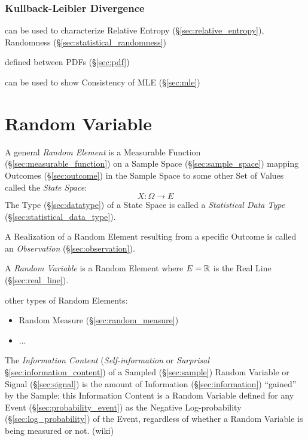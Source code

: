 \subsubsection{Kullback-Leibler Divergence}\label{sec:kullback_leibler}

can be used to characterize Relative Entropy (\S\ref{sec:relative_entropy}),
Randomness (\S\ref{sec:statistical_randomness})

defined between PDFs (\S\ref{sec:pdf})

can be used to show Consistency of MLE (\S\ref{sec:mle})



\section{Random Variable}\label{sec:random_variable}

A general \emph{Random Element} is a Measurable Function
(\S\ref{sec:measurable_function}) on a Sample Space (\S\ref{sec:sample_space})
mapping Outcomes (\S\ref{sec:outcome}) in the Sample Space to some other Set of
Values called the \emph{State Space}:
\[
  X : \Omega \to E
\]
The Type (\S\ref{sec:datatype}) of a State Space is called a \emph{Statistical
  Data Type} (\S\ref{sec:statistical_data_type}).

A Realization of a Random Element resulting from a specific Outcome is called an
\emph{Observation} (\S\ref{sec:observation}).

A \emph{Random Variable} is a Random Element where $E = \mathbb{R}$ is the Real Line
(\S\ref{sec:real_line}).

other types of Random Elements:
\begin{itemize}
  \item Random Measure (\S\ref{sec:random_measure})
  \item ...
\end{itemize}

The \emph{Information Content} (\emph{Self-information} or \emph{Surprisal}
\S\ref{sec:information_content}) of a Sampled (\S\ref{sec:sample}) Random
Variable or Signal (\S\ref{sec:signal}) is the amount of Information
(\S\ref{sec:information}) ``gained'' by the Sample; this Information Content is
a Random Variable defined for any Event (\S\ref{sec:probability_event}) as the
Negative Log-probability (\S\ref{sec:log_probability}) of the Event,
regardless of whether a Random Variable is being measured or not. (wiki)

